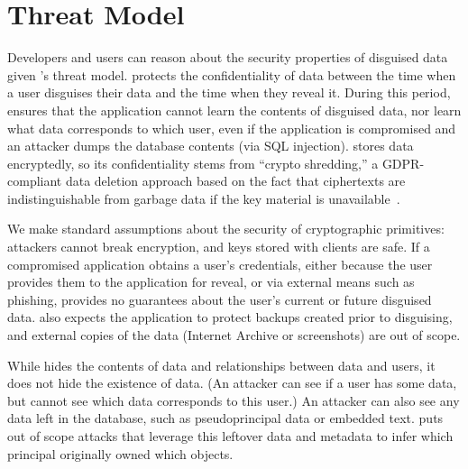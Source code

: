 \section{Threat Model}
\label{s:threat}
%
%
%
Developers and users can reason about the security properties of disguised data given \sys's
threat model.
\sys protects the confidentiality of \xxed data between the time when a user
disguises their data and the time when they reveal it.
%
%
During this period, \sys ensures that the application cannot learn the contents of
disguised data, nor learn what \xxed data corresponds to which user, even if the
application is compromised and an attacker dumps the database contents (\eg via
SQL injection).
%
\sys stores \xxed data encryptedly, so its confidentiality stems from ``crypto
shredding,'' a GDPR-compliant data deletion approach based on the fact that
ciphertexts are indistinguishable from garbage data if the key material is
unavailable~\cite{dnefs,townsend:cryptoshredding,aws:cryptoshredding,gtr:cryptoshredding}.
%

%
We make standard assumptions about the security of cryptographic primitives:
attackers cannot break encryption, and keys stored with clients are safe.
%
If a compromised application obtains a user's credentials, either because the
user provides them to the application for reveal, or via external means such as
phishing, \sys provides no guarantees about the user's current or future
disguised data.
%
\sys also expects the application to protect backups created prior to
disguising, and external copies of the data (\eg Internet Archive or
screenshots) are out of scope.
%

%
While \sys hides the contents of \xxed data and relationships between \xxed data
and users, it does not hide the existence of
\xxed data. (An attacker can see if
a user has \xxed some data, but cannot see which \xxed data corresponds to this
user.)
%
An attacker can also see any data left in the database, such as pseudoprincipal
data or embedded text.
%
\sys puts out of scope attacks that leverage this leftover data
and metadata to infer which principal originally owned which objects.
%

